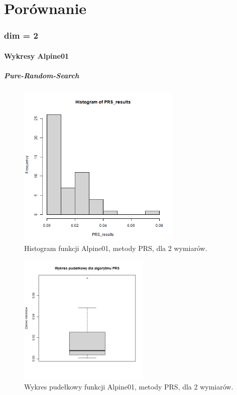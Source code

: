 \documentclass{lab}
\begin{document}
\newpage
\part{Porównanie}
\section{dim = 2}
\subsection{Wykresy Alpine01}
\subsubsection{Pure-Random-Search}
\begin{figure}[H]
  \centering
  \includegraphics[width=0.7\textwidth]{img/dim2_PRS_Alpine01_his.png}
  \caption{Histogram funkcji Alpine01, metody PRS, dla 2 wymiarów.}
\end{figure}
\begin{figure}[H]
  \centering
  \includegraphics[width=0.56\textwidth]{img/dim2_PRS_Alpine01.png}
  \caption{Wykres pudełkowy funkcji Alpine01, metody PRS, dla 2 wymiarów.}
\end{figure}
\end{document}
